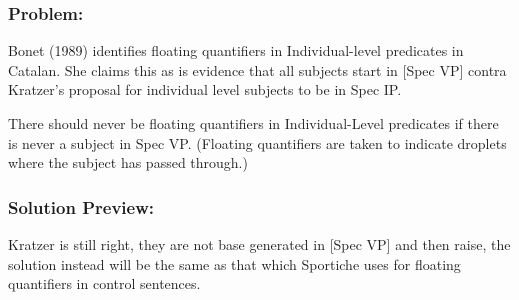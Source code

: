 \documentclass[landscape]{article}
\begin{document}
\subsubsection*{Problem:}
Bonet (1989) identifies floating quantifiers in Individual-level predicates in Catalan. She claims this as is evidence that all subjects start in [Spec VP] contra Kratzer's proposal for individual level subjects to be in Spec IP.

There should never be floating quantifiers in Individual-Level predicates if there is never a subject in Spec VP. (Floating quantifiers are taken to indicate droplets where the subject has passed through.)

\subsubsection*{Solution Preview:}
Kratzer is still right, they are not base generated in [Spec VP] and then raise, the solution instead will be the same as that which Sportiche uses for floating quantifiers in control sentences.
\end{document}
